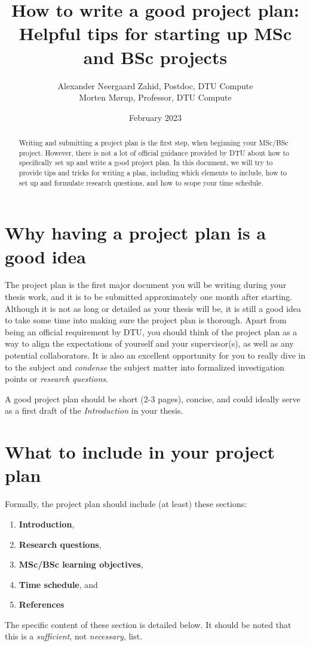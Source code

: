 \documentclass{article}
\title{How to write a good project plan:\\%
       Helpful tips for starting up MSc and BSc projects}
\author{Alexander Neergaard Zahid, Postdoc, DTU Compute\\%
        Morten Mørup, Professor, DTU Compute}
\date{February 2023}
\begin{document}
\maketitle

\begin{abstract}
    Writing and submitting a project plan is the first step, when beginning your MSc/BSc project. 
    However, there is not a lot of official guidance provided by DTU about how to specifically set up and write a good project plan.
    In this document, we will try to provide tips and tricks for writing a plan, including which elements to include, how to set up and formulate research questions, and how to scope your time schedule.
\end{abstract}

\section{Why having a project plan is a good idea}
The project plan is the first major document you will be writing during your thesis work, and it is to be submitted approximately one month after starting. 
Although it is not as long or detailed as your thesis will be, it is still a good idea to take some time into making sure the project plan is thorough.
Apart from being an official requirement by DTU, you should think of the project plan as a way to align the expectations of yourself and your supervisor(s), as well as any potential collaborators.
It is also an excellent opportunity for you to really dive in to the subject and \emph{condense} the subject matter into formalized investigation points or \emph{research questions}.

A good project plan should be short (2-3 pages), concise, and could ideally serve as a first draft of the \emph{Introduction} in your thesis.

\section{What to include in your project plan}
Formally, the project plan should include (at least) these sections:
\begin{enumerate}
    \item \textbf{Introduction},
    \item \textbf{Research questions},
    \item \textbf{MSc/BSc learning objectives},
    \item \textbf{Time schedule}, and
    \item \textbf{References}
\end{enumerate}
The specific content of these section is detailed below.
It should be noted that this is a \textit{sufficient}, not \textit{necessary}, list.
\end{document}

